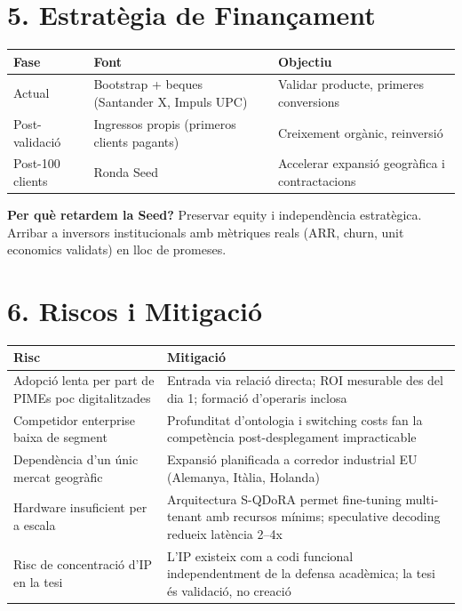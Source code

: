 \documentclass[11pt,a4paper]{article}
\begin{document}
\section{5. Estratègia de Finançament}

\begin{center}
\renewcommand{\arraystretch}{1.3}
\begin{tabularx}{0.92\textwidth}{l l X}
\toprule
\textbf{Fase} & \textbf{Font} & \textbf{Objectiu} \\
\midrule
Actual & Bootstrap + beques (Santander X, Impuls UPC) & Validar producte, primeres conversions \\
Post-validació & Ingressos propis (primeros clients pagants) & Creixement orgànic, reinversió \\
Post-100 clients & Ronda Seed & Accelerar expansió geogràfica i contractacions \\
\bottomrule
\end{tabularx}
\end{center}

\begin{keybox}
\textbf{Per què retardem la Seed?} Preservar equity i independència estratègica. Arribar a inversors institucionals amb mètriques reals (ARR, churn, unit economics validats) en lloc de promeses.
\end{keybox}

\section{6. Riscos i Mitigació}

\begin{center}
\renewcommand{\arraystretch}{1.3}
\begin{tabularx}{0.92\textwidth}{X X}
\toprule
\textbf{Risc} & \textbf{Mitigació} \\
\midrule
Adopció lenta per part de PIMEs poc digitalitzades & Entrada via relació directa; ROI mesurable des del dia 1; formació d'operaris inclosa \\
Competidor enterprise baixa de segment & Profunditat d'ontologia i switching costs fan la competència post-desplegament impracticable \\
Dependència d'un únic mercat geogràfic & Expansió planificada a corredor industrial EU (Alemanya, Itàlia, Holanda) \\
Hardware insuficient per a escala & Arquitectura S-QDoRA permet fine-tuning multi-tenant amb recursos mínims; speculative decoding redueix latència 2--4x \\
Risc de concentració d'IP en la tesi & L'IP existeix com a codi funcional independentment de la defensa acadèmica; la tesi és validació, no creació \\
\bottomrule
\end{tabularx}
\end{center}
\end{document}
